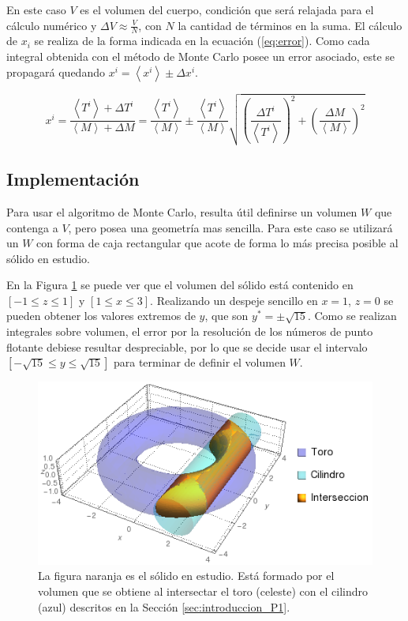 \documentclass{article}
\def\mean#1{\left< #1 \right>}
\begin{document}
En este caso $V$ es el volumen del cuerpo, condición que será relajada para el cálculo numérico y $\Delta V \approx \frac{V}{N}$, con $N$ la cantidad de términos en la suma. El cálculo de $x_i$ se realiza de la forma indicada en la ecuación (\ref{eq:error}). Como cada integral obtenida con el método de Monte Carlo posee un error asociado, este se propagará quedando $x^i = \mean{x^i} \pm \Delta x^i$.

\begin{equation}
  x^i = \frac{\mean{T^i} + \Delta T^i}{\mean{M} + \Delta M} = \frac{\mean{T^i}}{\mean{M}} \pm \frac{\mean{T^i}}{\mean{M}} \sqrt{ \left( \frac{\Delta T^i}{\mean{T^i}} \right)^2 + \left( \frac{\Delta M}{\mean{M}} \right)^2 }
  \label{eq:error}
\end{equation}

\subsection{Implementación}

Para usar el algoritmo de Monte Carlo, resulta útil definirse un volumen $W$ que contenga a $V$, pero posea una geometría mas sencilla. Para este caso se utilizará un $W$ con forma de caja rectangular que acote de forma lo más precisa posible al sólido en estudio.

En la Figura \ref{fig:interseccion_P1} se puede ver que el volumen del sólido está contenido en $ [-1 \le z \le 1]$ y $[1 \le x \le 3]$. Realizando un despeje sencillo en $x = 1$, $z = 0$ se pueden obtener los valores extremos de $y$, que son $y^* = \pm \sqrt{15}$. Como se realizan integrales sobre volumen, el error por la resolución de los números de punto flotante debiese resultar despreciable, por lo que se decide usar el intervalo $[-\sqrt{15} \le y \le \sqrt{15} ]$ para terminar de definir el volumen $W$.

\begin{figure}[ht]
  \centering
  \includegraphics[scale = 0.5]{images/interseccion_P1.png}
  \caption{La figura naranja es el sólido en estudio. Está formado por el volumen que se obtiene al intersectar el toro (celeste) con el cilindro (azul) descritos en la Sección \ref{sec:introduccion_P1}. }
  \label{fig:interseccion_P1}
\end{figure}
\end{document}
